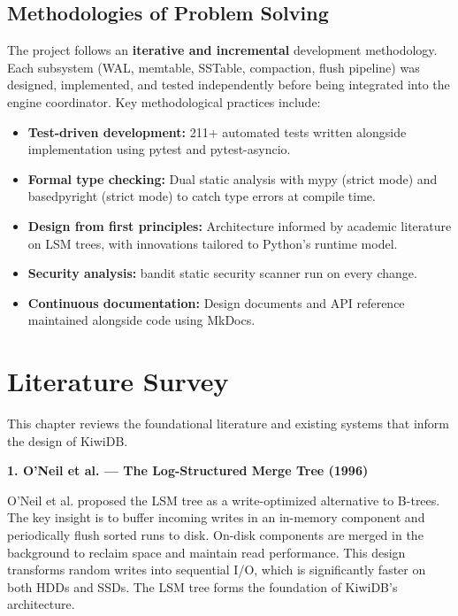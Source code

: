 \documentclass[oneside,a4paper,12pt]{book}
\begin{document}
\section{Methodologies of Problem Solving}

The project follows an \textbf{iterative and incremental} development methodology. Each subsystem (WAL, memtable, SSTable, compaction, flush pipeline) was designed, implemented, and tested independently before being integrated into the engine coordinator. Key methodological practices include:

\begin{itemize}[leftmargin=2em]
    \item \textbf{Test-driven development:} 211+ automated tests written alongside implementation using pytest and pytest-asyncio.
    \item \textbf{Formal type checking:} Dual static analysis with mypy (strict mode) and basedpyright (strict mode) to catch type errors at compile time.
    \item \textbf{Design from first principles:} Architecture informed by academic literature on LSM trees, with innovations tailored to Python's runtime model.
    \item \textbf{Security analysis:} bandit static security scanner run on every change.
    \item \textbf{Continuous documentation:} Design documents and API reference maintained alongside code using MkDocs.
\end{itemize}

\chapter{Literature Survey}

This chapter reviews the foundational literature and existing systems that inform the design of KiwiDB.

\vspace{1\baselineskip}

\textbf{1. O'Neil et al. --- The Log-Structured Merge Tree (1996) \cite{c5}}

O'Neil et al. proposed the LSM tree as a write-optimized alternative to B-trees. The key insight is to buffer incoming writes in an in-memory component and periodically flush sorted runs to disk. On-disk components are merged in the background to reclaim space and maintain read performance. This design transforms random writes into sequential I/O, which is significantly faster on both HDDs and SSDs. The LSM tree forms the foundation of KiwiDB's architecture.
\end{document}
